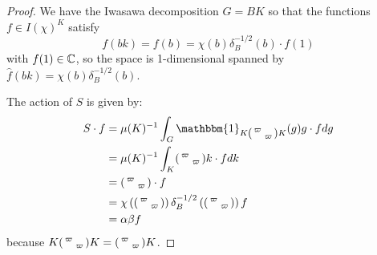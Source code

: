 \begin{proof}
    We have the Iwasawa decomposition $G=BK$ so that the functions $f \in I(\chi)^K$ satisfy
    $$f(bk)=f(b)=\chi(b)\delta_B^{-1/2}(b) \cdot f(1)$$ with $f(1) \in \mathbb{C}$, so the space is 1-dimensional spanned by $\hat{f}(bk) = \chi(b)\delta_B^{-1/2}(b)$.

    The action of $S$ is given by:
    \begin{equation*}
        \begin{split}
            S\cdot f &= \mu(K)^{-1}\int_G \mathbbm{1}_{K\begin{psmallmatrix}\varpi & \\ & \varpi\end{psmallmatrix}K}(g) g \cdot f dg \\
            &= \mu(K)^{-1}\int_K \begin{psmallmatrix}\varpi & \\ & \varpi\end{psmallmatrix}k \cdot f dk \\
            &= \begin{psmallmatrix}\varpi & \\ & \varpi\end{psmallmatrix}\cdot f \\
            &= \chi\left(\begin{psmallmatrix}\varpi & \\ & \varpi\end{psmallmatrix}\right) \delta_B^{-1/2}\left(\begin{psmallmatrix}\varpi & \\ & \varpi\end{psmallmatrix}\right) f \\
            &= \alpha\beta f
        \end{split}
    \end{equation*}
    because $K\begin{psmallmatrix}\varpi & \\ & \varpi\end{psmallmatrix}K = \begin{psmallmatrix}\varpi & \\ & \varpi\end{psmallmatrix}K$.


\end{proof}
